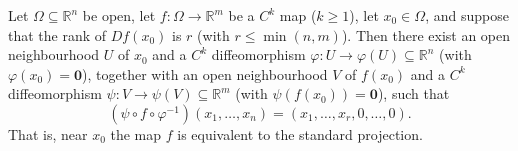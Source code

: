 \begin{theorem}\label{thm:rank_theorem}
Let $\Omega \subseteq \mathbb{R}^n$ be open, let $f: \Omega \to \mathbb{R}^m$ be a $C^k$ map ($k \ge 1$), let $x_0 \in \Omega$, and suppose that the rank of $Df(x_0)$ is $r$ (with $r \le \min(n, m)$). Then there exist an open neighbourhood $U$ of $x_0$ and a $C^k$ diffeomorphism $\varphi: U \to \varphi(U) \subseteq \mathbb{R}^n$ (with $\varphi(x_0) = \mathbf{0}$), together with an open neighbourhood $V$ of $f(x_0)$ and a $C^k$ diffeomorphism $\psi: V \to \psi(V) \subseteq \mathbb{R}^m$ (with $\psi(f(x_0)) = \mathbf{0}$), such that
\[
(\psi \circ f \circ \varphi^{-1})(x_1, \dots, x_n) = (x_1, \dots, x_r, 0, \dots, 0).
\]
That is, near $x_0$ the map $f$ is equivalent to the standard projection.
\end{theorem}

